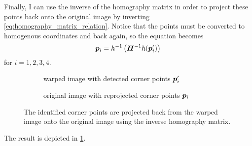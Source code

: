 \documentclass[../report.tex]{subfiles}
\begin{document}
Finally, I can use the inverse of the homography matrix in order to project these points back onto the original image by inverting \cref{eq:homography_matrix_relation}.
Notice that the points must be converted to homogenous coordinates and back again, so the equation becomes 
\begin{equation}
    {\bm{p}}_i =
    h^{-1}\left(
        {\bm{H}}^{-1}
        h({\bm{p}}'_i)
    \right)
\end{equation}
for $i=1,2,3,4$.
\begin{figure}
    \centering
    \begin{subfigure}[t]{0.48\textwidth}
        \caption{warped image with detected corner points ${\bm{p}}'_i$}
    \end{subfigure}
    \hfill
    \begin{subfigure}[t]{0.48\textwidth}
        \caption{original image with reprojected corner points ${\bm{p}}_i$}
    \end{subfigure}
    \caption{The identified corner points are projected back from the warped image onto the original image using the inverse homography matrix.}
    \label{fig:corners_result}
\end{figure}
The result is depicted in \cref{fig:corners_result}.
\end{document}
